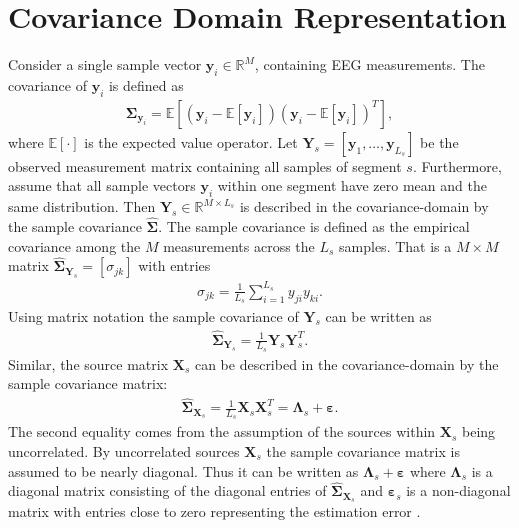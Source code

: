 \section{Covariance Domain Representation}\label{sec:cov}
Consider a single sample vector $\textbf{y}_i\in \mathbb{R}^{M}$, containing EEG measurements. 
The covariance of $\mathbf{y}_i$ is defined as 
\begin{align*}
\boldsymbol{\Sigma}_{\mathbf{y}_i} = \mathbb{E}[(\mathbf{y}_i - \mathbb{E}[\mathbf{y}_i]) (\mathbf{y}_i - \mathbb{E}[\mathbf{y}_i])^T],
\end{align*}
where $\mathbb{E}[\cdot]$ is the expected value operator. 
Let $\mathbf{Y}_{s} = \left[\mathbf{y}_1, \dots, \mathbf{y}_{L_s}\right]$ be the observed measurement matrix containing all samples of segment $s$.
Furthermore, assume that all sample vectors $\mathbf{y}_i$ within one segment have zero mean and the same distribution.  
Then $\mathbf{Y}_s \in \mathbb{R}^{M \times L_s}$ is described in the covariance-domain by the sample covariance $\widehat{\boldsymbol{\Sigma}}$. 
The sample covariance is defined as the empirical covariance among the $M$ measurements across the $L_s$ samples. 
That is a $M \times M$ matrix $\widehat{\boldsymbol{\Sigma}}_{\mathbf{Y}_s} = [\sigma_{jk}]$ with entries 
\begin{align*}
\sigma_{jk} = \frac{1}{L_s} \sum_{i=1}^{L_s} y_{ji} y_{ki}.
\end{align*}
Using matrix notation the sample covariance of $\mathbf{Y}_s$ can be written as
\begin{align*}
\widehat{\boldsymbol{\Sigma}}_{\mathbf{Y}_s} = \frac{1}{L_s} \mathbf{Y}_s \mathbf{Y}_s^T.
\end{align*} 
Similar, the source matrix $\mathbf{X}_s$ can be described in the covariance-domain by the sample covariance matrix:
\begin{align*}
\widehat{\boldsymbol{\Sigma}}_{\mathbf{X}_s} = \frac{1}{L_s} \mathbf{X}_s \mathbf{X}_s^T = \boldsymbol{\Lambda}_s + \boldsymbol{\varepsilon}. 
\end{align*}
The second equality comes from the assumption of the sources within $\mathbf{X}_s$ being uncorrelated. 
By uncorrelated sources $\mathbf{X}_s$ the sample covariance matrix is assumed to be nearly diagonal. 
Thus it can be written as $\boldsymbol{\Lambda}_s + \boldsymbol{\varepsilon}$ where $\boldsymbol{\Lambda}_s$ is a diagonal matrix consisting of the diagonal entries of $\widehat{\boldsymbol{\Sigma}}_{\mathbf{X}_s}$ and $ \boldsymbol{\varepsilon}_s$ is a non-diagonal matrix with entries close to zero representing the estimation error \cite{Balkan2015}.

